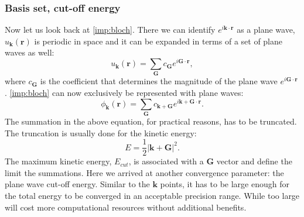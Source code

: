 \subsubsection{Basis set, cut-off energy }
Now let us look back at \autoref{imp:bloch}. There we can identify $e^{i\mathbf{k}\cdot\mathbf{r}}$ as a plane wave, $u_{\mathbf{k}}(\mathbf{r})$ is periodic in space and it can be expanded in terms of a set of plane waves as well:
\begin{equation}
u_{\mathbf{k}}(\mathbf{r})=\sum_{\mathbf{G}}c_{\mathbf{G}}e^{i\mathbf{G}\cdot\mathbf{r}},
\end{equation}
where $c_{\mathbf{G}}$ is the coefficient that determines the magnitude of the plane wave $e^{i\mathbf{G}\cdot\mathbf{r}}$. \autoref{imp:bloch} can now exclusively be represented with plane waves:
\begin{equation}
\phi_{\mathbf{k}}(\mathbf{r})=\sum_{\mathbf{G}}c_{\mathbf{k+G}}e^{i\mathbf{k+G}\cdot\mathbf{r}}.
\end{equation}
The summation in the above equation, for practical reasons, has to be truncated. The truncation is usually done for the kinetic energy:
\begin{equation}
E=\frac{1}{2}|\mathbf{k+G}|^2.
\end{equation}
The maximum kinetic energy, $E_{cut}$, is associated with a $\mathbf{G}$ vector and define the limit the summations. Here we arrived at another convergence parameter: the plane wave cut-off energy. Similar to the $\mathbf{k}$ points, it has to be large enough for the total energy to be converged in an acceptable precision range.  While too large will cost more computational resources without additional benefits.
